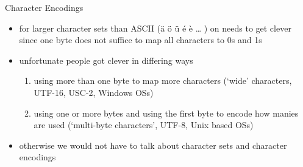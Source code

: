 \documentclass[ignorenonframetext,]{beamer}
\providecommand{\tightlist}{%
  \setlength{\itemsep}{0pt}\setlength{\parskip}{0pt}}
\begin{document}
\begin{frame}{Character Encodings}

\begin{itemize}
\tightlist
\item
  for larger character sets than ASCII (ä ö ü é è \ldots{} ) on needs to
  get clever since one byte does not suffice to map all characters to 0s
  and 1s
\item
  unfortunate people got clever in differing ways

  \begin{enumerate}
  \def\labelenumi{\arabic{enumi})}
  \tightlist
  \item
    using more than one byte to map more characters (`wide' characters,
    UTF-16, USC-2, Windows OSs)
  \item
    using one or more bytes and using the first byte to encode how
    manies are used (`multi-byte characters', UTF-8, Unix based OSs)
  \end{enumerate}
\item
  otherwise we would not have to talk about character sets and character
  encodings
\end{itemize}

\end{frame}
\end{document}
